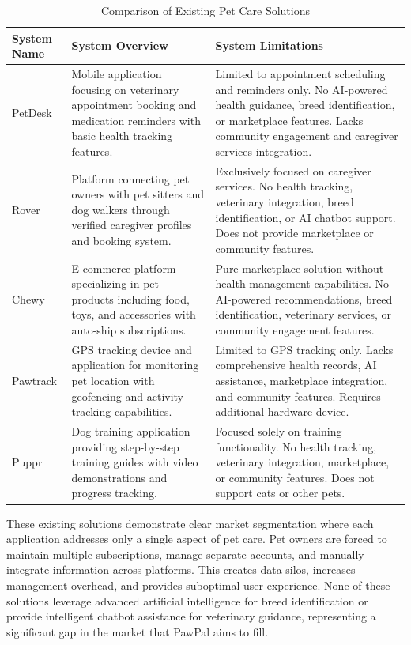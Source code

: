 \begin{table}[H]
\centering
\caption{Comparison of Existing Pet Care Solutions}
\begin{tabular}{|p{2.5cm}|p{5cm}|p{5cm}|}
\hline
\textbf{System Name} & \textbf{System Overview} & \textbf{System Limitations} \\ \hline
PetDesk & Mobile application focusing on veterinary appointment booking and medication reminders with basic health tracking features. & Limited to appointment scheduling and reminders only. No AI-powered health guidance, breed identification, or marketplace features. Lacks community engagement and caregiver services integration. \\ \hline
Rover & Platform connecting pet owners with pet sitters and dog walkers through verified caregiver profiles and booking system. & Exclusively focused on caregiver services. No health tracking, veterinary integration, breed identification, or AI chatbot support. Does not provide marketplace or community features. \\ \hline
Chewy & E-commerce platform specializing in pet products including food, toys, and accessories with auto-ship subscriptions. & Pure marketplace solution without health management capabilities. No AI-powered recommendations, breed identification, veterinary services, or community engagement features. \\ \hline
Pawtrack & GPS tracking device and application for monitoring pet location with geofencing and activity tracking capabilities. & Limited to GPS tracking only. Lacks comprehensive health records, AI assistance, marketplace integration, and community features. Requires additional hardware device. \\ \hline
Puppr & Dog training application providing step-by-step training guides with video demonstrations and progress tracking. & Focused solely on training functionality. No health tracking, veterinary integration, marketplace, or community features. Does not support cats or other pets. \\ \hline
\end{tabular}
\label{tab:system_comparison}
\end{table}

These existing solutions demonstrate clear market segmentation where each application addresses only a single aspect of pet care. Pet owners are forced to maintain multiple subscriptions, manage separate accounts, and manually integrate information across platforms. This creates data silos, increases management overhead, and provides suboptimal user experience. None of these solutions leverage advanced artificial intelligence for breed identification or provide intelligent chatbot assistance for veterinary guidance, representing a significant gap in the market that PawPal aims to fill.

